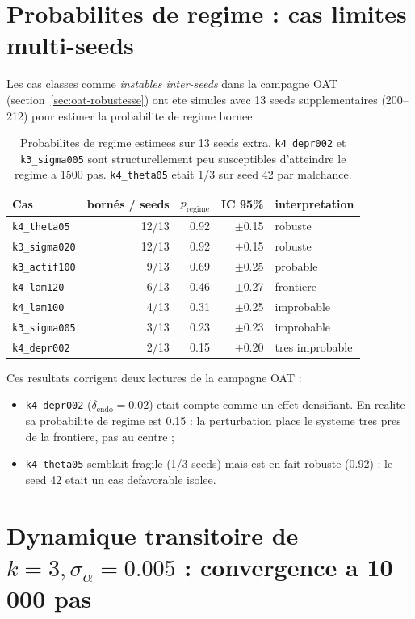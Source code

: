 \documentclass[11pt,a4paper]{article}
\begin{document}
\section{Probabilites de regime : cas limites multi-seeds}
\label{sec:multirun}

Les cas classes comme \emph{instables inter-seeds} dans la campagne OAT
(section~\ref{sec:oat-robustesse}) ont ete simules avec 13 seeds
supplementaires (200--212) pour estimer la probabilite de regime bornee.

\begin{table}[H]
\centering
\small
\begin{tabular}{lrrrl}
\toprule
Cas & bornés / seeds & \(p_{\mathrm{regime}}\) & IC 95\% & interpretation \\
\midrule
\texttt{k4\_theta05} & 12/13 & 0.92 & $\pm$0.15 & robuste \\
\texttt{k3\_sigma020} & 12/13 & 0.92 & $\pm$0.15 & robuste \\
\texttt{k3\_actif100} & 9/13  & 0.69 & $\pm$0.25 & probable \\
\texttt{k4\_lam120}   & 6/13  & 0.46 & $\pm$0.27 & frontiere \\
\texttt{k4\_lam100}   & 4/13  & 0.31 & $\pm$0.25 & improbable \\
\texttt{k3\_sigma005} & 3/13  & 0.23 & $\pm$0.23 & improbable \\
\texttt{k4\_depr002}  & 2/13  & 0.15 & $\pm$0.20 & tres improbable \\
\bottomrule
\end{tabular}
\caption{Probabilites de regime estimees sur 13 seeds extra.
\texttt{k4\_depr002} et \texttt{k3\_sigma005} sont structurellement
peu susceptibles d'atteindre le regime a 1500 pas.
\texttt{k4\_theta05} etait 1/3 sur seed 42 par malchance.}
\end{table}

Ces resultats corrigent deux lectures de la campagne OAT :
\begin{itemize}
  \item \texttt{k4\_depr002} (\(\delta_{\mathrm{endo}}=0.02\)) etait compte
  comme un effet densifiant. En realite sa probabilite de regime est 0.15 :
  la perturbation place le systeme tres pres de la frontiere, pas au centre ;
  \item \texttt{k4\_theta05} semblait fragile (1/3 seeds) mais est en fait
  robuste (0.92) : le seed 42 etait un cas defavorable isolee.
\end{itemize}

\section{Dynamique transitoire de \(k=3, \sigma_\alpha=0.005\) : convergence a 10\,000 pas}
\label{sec:explosion-k3}
\end{document}
